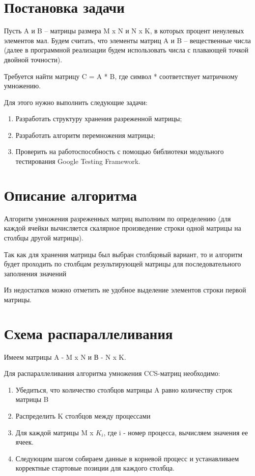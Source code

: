 \documentclass{report}
\begin{document}
\newpage
\section*{Постановка задачи}
\par Пусть A и B – матрицы размера M x N и N x K, в которых процент ненулевых элементов мал. Будем считать, что элементы матриц A и B – вещественные числа (далее в программной реализации будем использовать числа с плавающей точкой двойной точности).
\par Требуется найти матрицу C = A * B, где символ * соответствует матричному умножению.
\par Для этого нужно выполнить следующие задачи:
\begin{enumerate}
\item Разработать структуру хранения разреженной матрицы;
\item Разработать алгоритм перемножения матрицы;
\item Проверить на работоспособность с помощью библиотеки модульного тестирования Google Testing Framework.
\end{enumerate}
\newpage

\section*{Описание алгоритма}
\par Алгоритм умножения разреженных матриц выполним по определению (для каждой ячейки вычисляется скалярное произведение строки одной матрицы на столбцы другой матрицы). 
\par Так как для хранения матрицы был выбран столбцовый вариант, то и алгоритм будет проходить по столбцам результирующей матрицы для последовательного заполнения значений
\par Из недостатков можно отметить не удобное выделение элементов строки первой матрицы.

\newpage
\section*{Схема распараллеливания}
\par Имеем матрицы A - M x N и В - N x K. 
\par Для распараллеливания алгоритма умножения CCS-матриц необходимо:
\begin{enumerate}
\item Убедиться, что количество столбцов  матрицы A равно количеству строк матрицы B
\item Распределить K столбцов между процессами
\item Для каждой матрицы M x $K_i$, где i - номер процесса, вычисляем значения ее ячеек.
\item Следующим шагом собираем данные в корневой процесс и устанавливаем корректные стартовые позиции для каждого столбца.
\end{enumerate}
\newpage
\end{document}
